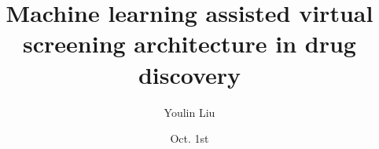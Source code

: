 
\setcounter{tocdepth}{2} %

% 

\title{Machine learning assisted virtual screening architecture in drug discovery}
\author{Youlin Liu}
\date{Oct. 1st}


 

\maketitle 

\tableofcontents






 





